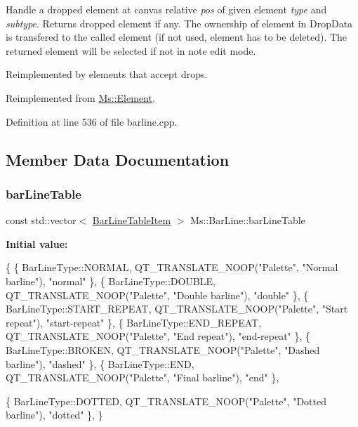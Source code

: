 Handle a dropped element at canvas relative {\itshape pos} of given element {\itshape type} and {\itshape subtype}. Returns dropped element if any. The ownership of element in Drop\+Data is transfered to the called element (if not used, element has to be deleted). The returned element will be selected if not in note edit mode.

Reimplemented by elements that accept drops. 

Reimplemented from \hyperlink{class_ms_1_1_element_a0ca69a9fb48e7b9fb481aacaf3860032}{Ms\+::\+Element}.



Definition at line 536 of file barline.\+cpp.



\subsection{Member Data Documentation}
\mbox{\label{class_ms_1_1_bar_line_ab5c2d4f158bd50744950a2b4e2aece0f}} 
\subsubsection{\texorpdfstring{bar\+Line\+Table}{barLineTable}}
{\footnotesize\ttfamily const std\+::vector$<$ \hyperlink{struct_ms_1_1_bar_line_table_item}{Bar\+Line\+Table\+Item} $>$ Ms\+::\+Bar\+Line\+::bar\+Line\+Table\hspace{0.3cm}{\ttfamily [static]}}

{\bfseries Initial value\+:}
\begin{DoxyCode}
\{
      \{ BarLineType::NORMAL,           QT\_TRANSLATE\_NOOP(\textcolor{stringliteral}{"Palette"}, \textcolor{stringliteral}{"Normal barline"}),   \textcolor{stringliteral}{"normal"} \},
      \{ BarLineType::DOUBLE,           QT\_TRANSLATE\_NOOP(\textcolor{stringliteral}{"Palette"}, \textcolor{stringliteral}{"Double barline"}),   \textcolor{stringliteral}{"double"} \},
      \{ BarLineType::START\_REPEAT,     QT\_TRANSLATE\_NOOP(\textcolor{stringliteral}{"Palette"}, \textcolor{stringliteral}{"Start repeat"}),     \textcolor{stringliteral}{"start-repeat"} \},
      \{ BarLineType::END\_REPEAT,       QT\_TRANSLATE\_NOOP(\textcolor{stringliteral}{"Palette"}, \textcolor{stringliteral}{"End repeat"}),       \textcolor{stringliteral}{"end-repeat"} \},
      \{ BarLineType::BROKEN,           QT\_TRANSLATE\_NOOP(\textcolor{stringliteral}{"Palette"}, \textcolor{stringliteral}{"Dashed barline"}),   \textcolor{stringliteral}{"dashed"} \},
      \{ BarLineType::END,              QT\_TRANSLATE\_NOOP(\textcolor{stringliteral}{"Palette"}, \textcolor{stringliteral}{"Final barline"}),    \textcolor{stringliteral}{"end"} \},

      \{ BarLineType::DOTTED,           QT\_TRANSLATE\_NOOP(\textcolor{stringliteral}{"Palette"}, \textcolor{stringliteral}{"Dotted barline"}),   \textcolor{stringliteral}{"dotted"} \},
      \}
\end{DoxyCode}


